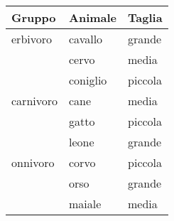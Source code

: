 \documentclass{article}
\begin{document}
\bigbreak

\begin{tabular}{lll}
    \toprule
    Gruppo    & Animale  & Taglia  \\
    \midrule
    erbivoro  & cavallo  & grande  \\
              & cervo    & media   \\
              & coniglio & piccola \\
    \addlinespace
    carnivoro & cane     & media   \\
              & gatto    & piccola \\
              & leone    & grande  \\
    \addlinespace
    onnivoro  & corvo    & piccola \\
              & orso     & grande  \\
              & maiale   & media   \\
    \bottomrule
\end{tabular}
\end{document}
